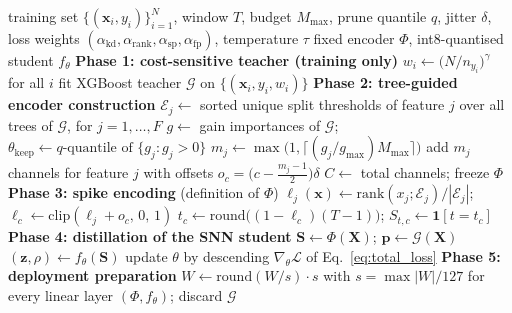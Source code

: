 \begin{algorithm}[!t]
\caption{Tree-to-Spike training (teacher, encoder, distillation)}
\label{alg:treespike_train}
\begin{algorithmic}[1]
\Require training set $\{(\mathbf{x}_i, y_i)\}_{i=1}^{N}$, window $T$,
         budget $M_{\max}$, prune quantile $q$, jitter $\delta$,
         loss weights $(\alpha_{\mathrm{kd}}, \alpha_{\mathrm{rank}},
         \alpha_{\mathrm{sp}}, \alpha_{\mathrm{fp}})$, temperature $\tau$
\Ensure fixed encoder $\Phi$, int8-quantised student $f_{\theta}$
\Statex \textbf{Phase 1: cost-sensitive teacher (training only)}
\State $w_i \gets \bigl(N / n_{y_i}\bigr)^{\gamma}$ for all $i$
\State fit XGBoost teacher $\mathcal{G}$ on
       $\{(\mathbf{x}_i, y_i, w_i)\}$
\Statex \textbf{Phase 2: tree-guided encoder construction}
\State $\mathcal{E}_j \gets$ sorted unique split thresholds of feature $j$
       over all trees of $\mathcal{G}$, for $j = 1,\dots,F$
\State $g \gets$ gain importances of $\mathcal{G}$;\;
       $\theta_{\mathrm{keep}} \gets q\text{-quantile of } \{g_j : g_j > 0\}$
    \State $m_j \gets \max\!\bigl(1, \lceil (g_j / g_{\max}) M_{\max} \rceil\bigr)$
    \State add $m_j$ channels for feature $j$ with offsets
           $o_c = \bigl(c - \tfrac{m_j-1}{2}\bigr)\delta$
  \EndIf {}
\EndFor
\State $C \gets$ total channels; freeze $\Phi$
\Statex \textbf{Phase 3: spike encoding} (definition of $\Phi$)
\State $\ell_j(\mathbf{x}) \gets \mathrm{rank}(x_j;\mathcal{E}_j)/|\mathcal{E}_j|$;\;
       $\ell_c \gets \mathrm{clip}(\ell_j + o_c,\, 0,\, 1)$
\State $t_c \gets \mathrm{round}\bigl((1-\ell_c)(T-1)\bigr)$;\;
       $S_{t,c} \gets \mathbf{1}[t = t_c]$
\Statex \textbf{Phase 4: distillation of the SNN student}
  \State $\mathbf{S} \gets \Phi(\mathbf{X})$;\;
         $\mathbf{p} \gets \mathcal{G}(\mathbf{X})$
  \State $(\mathbf{z}, \rho) \gets f_{\theta}(\mathbf{S})$
  \State update $\theta$ by descending
         $\nabla_{\theta}\mathcal{L}$ of Eq.~\ref{eq:total_loss}
\EndFor
\Statex \textbf{Phase 5: deployment preparation}
\State $W \gets \mathrm{round}(W / s) \cdot s$ with $s = \max|W|/127$
       for every linear layer 
\State \Return $(\Phi, f_{\theta})$; discard $\mathcal{G}$
\end{algorithmic}
\end{algorithm}

